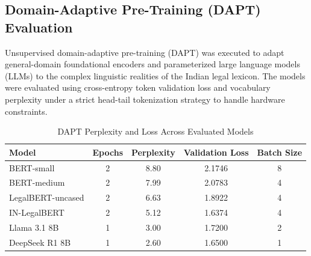 \subsection{Domain-Adaptive Pre-Training (DAPT) Evaluation}
Unsupervised domain-adaptive pre-training (DAPT) was executed to adapt general-domain foundational encoders and parameterized large language models (LLMs) to the complex linguistic realities of the Indian legal lexicon. The models were evaluated using cross-entropy token validation loss and vocabulary perplexity under a strict head-tail tokenization strategy to handle hardware constraints.

\begin{table}[htbp]
	\caption{DAPT Perplexity and Loss Across Evaluated Models}
	\label{tab:dapt_metrics}
	\centering
	\begin{tabular}{|l|c|c|c|c|}
		\hline
		\textbf{Model} & \textbf{Epochs} & \textbf{Perplexity} & \textbf{Validation Loss} & \textbf{Batch Size} \\ \hline
		BERT-small & 2 & 8.80 & 2.1746 & 8 \\ \hline
		BERT-medium & 2 & 7.99 & 2.0783 & 4 \\ \hline
		LegalBERT-uncased & 2 & 6.63 & 1.8922 & 4 \\ \hline
		IN-LegalBERT & 2 & 5.12 & 1.6374 & 4 \\ \hline
		Llama 3.1 8B & 1 & 3.00 & 1.7200 & 2 \\ \hline
		DeepSeek R1 8B & 1 & 2.60 & 1.6500 & 1 \\ \hline
	\end{tabular}
\end{table}

